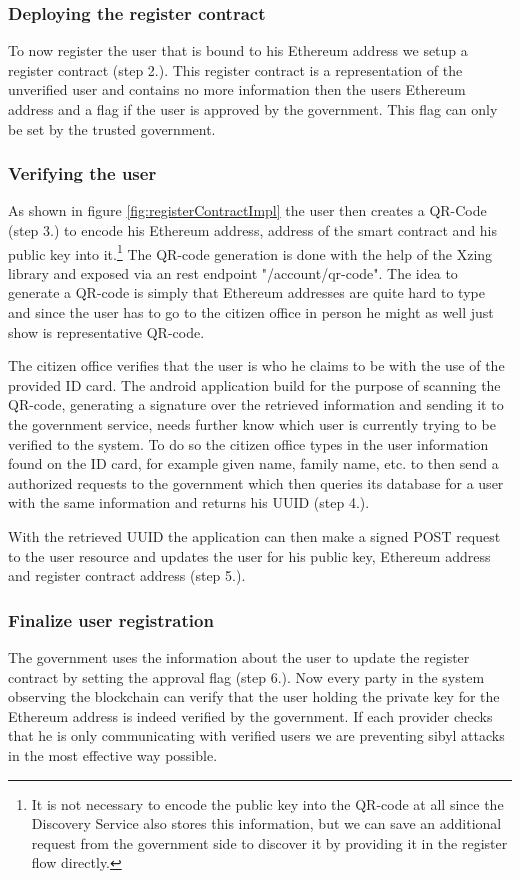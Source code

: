 \subsubsection{Deploying the register contract}
To now register the user that is bound to his Ethereum address we setup a register contract (step 2.). This register contract is a representation of the unverified user and contains no more information then the users Ethereum address and a flag if the user is approved by the government. This flag can only be set by the trusted government.

\subsubsection{Verifying the user}
As shown in figure \ref{fig:registerContractImpl} the user then creates a QR-Code (step 3.) to encode his Ethereum address, address of the smart contract and his public key into it.\footnote{It is not necessary to encode the public key into the QR-code at all since the Discovery Service also stores this information, but we can save an additional request from the government side to discover it by providing it in the register flow directly.} The QR-code generation is done with the help of the Xzing library and exposed via an rest endpoint "/account/qr-code". The idea to generate a QR-code is simply that Ethereum addresses are quite hard to type and since the user has to go to the citizen office in person he might as well just show is representative QR-code.

The citizen office verifies that the user is who he claims to be with the use of the provided ID card. The android application build for the purpose of scanning the QR-code, generating a signature over the retrieved information and sending it to the government service, needs further know which user is currently trying to be verified to the system. To do so the citizen office types in the user information found on the ID card, for example given name, family name, etc. to then send a authorized requests to the government which then queries its database for a user with the same information and returns his UUID (step 4.). 

With the retrieved UUID the application can then make a signed POST request to the user resource  and updates the user for his public key, Ethereum address and register contract address (step 5.).

\subsubsection{Finalize user registration}
The government uses the information about the user to update the register contract by setting the approval flag (step 6.). Now every party in the system observing the blockchain can verify that the user holding the private key for the Ethereum address is indeed verified by the government. If each provider checks that he is only communicating with verified users we are preventing sibyl attacks in the most effective way possible.

